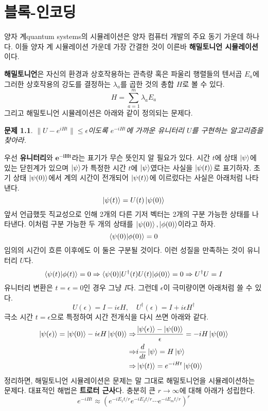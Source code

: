 \documentclass[a4paper,atbegshi,chapter,]{oblivoir}
\newtheorem{prob}{문제}[chapter]
\begin{document}
\chapter{블록-인코딩}
양자 계{\tiny quantum systems}의 시뮬레이션은 양자 컴퓨터 개발의 주요 동기 가운데 하나다.
이들 양자 계 시뮬레이션 가운데 가장 간결한 것이 이른바 \textbf{해밀토니언 시뮬레이션}이다.

\textbf{해밀토니언}은 자신의 환경과 상호작용하는 관측량 혹은 파울리 행렬들의 텐서곱
$E_a$에 그러한 상호작용의 강도를 결정하는 $\lambda_a$를 곱한 것의 총합 $H$로 볼 수 있다.
\[
  H = \sum_{a=1}^m\lambda_a E_a
\]
그리고 해밀토니언 시뮬레이션은 아래와 같이 정의되는 문제다.
\begin{prob}
  $\|U-e^{iHt}\|\leq\epsilon$이도록 $e^{-iHt}$에 가까운 유니터리 $U$를 구현하는
  알고리즘을 찾아라.
\end{prob}
우선 \textbf{유니터리}와 $\pmb{e^{-iHt}}$라는 표기가 무슨 뜻인지 알 필요가 있다.
시간 $t$에 상태 $\ket{\psi}$에 있는 닫힌계가 있으며 $\ket{\psi}$가 특정한 시간 $t$에
$\ket{\psi}$였다는 사실을 $\ket{\psi(t)}$로 표기하자. 초기 상태 $\ket{\psi(0)}$에서
계의 시간이 전개되어 $\ket{\psi(t)}$에 이르렀다는 사실은 아래처럼 나타낸다.
\[
  \ket{\psi(t)}=U(t)\ket{\psi(0)}
\]
앞서 언급했듯 직교성으로 인해 2개의 다른 기저 벡터는 2개의 구분 가능한 상태를 나타낸다.
이처럼 구분 가능한 두 개의 상태를 $\ket{\psi(0)},\ket{\phi(0)}$이라고 하자. 
\[
  \braket{\psi(0)|\phi(0)}=0
\]
임의의 시간이 흐른 이후에도 이 둘은 구분될 것이다. 이런 성질을 만족하는 것이 
유니터리 $U$다. 
\[
  \braket{\psi(t)|\phi(t)}=0 \Rightarrow \braket{\psi(0)|U^{\dagger}(t)U(t)|\phi(0)}=0
                             \Rightarrow U^{\dagger}U=I
\]
유니터리 변환은 $t=\epsilon=0$인 경우 그냥 $I$다. 그런데 $\epsilon$이 극미량이면
아래처럼 쓸 수 있다.
\[
  U(\epsilon)=I-i\epsilon H,\quad U^{\dagger}(\epsilon)=I+i\epsilon H^{\dagger}
\]
극소 시간 $t=\epsilon$으로 특정하여 시간 전개식을 다시 쓰면 아래와 같다.
\begin{align*}
  \ket{\psi(\epsilon)}=\ket{\psi(0)}-i\epsilon H\ket{\psi(0)}
  \Rightarrow &\frac{\ket{\psi(\epsilon)}-\ket{\psi(0)}}{\epsilon}=-iH\ket{\psi(0)} \\
  \Rightarrow & i\frac{d}{dt}\ket{\psi} = H\ket{\psi}\\
  \Rightarrow &\ket{\psi(t)}=e^{-iHt}\ket{\psi(0)}
\end{align*}
정리하면, 해밀토니언 시뮬레이션은 문제는 말 그대로 해밀토니언을 시뮬레이션하는
문제다. 대표적인 해법은 \textbf{트로터 근사}다. 충분히 큰 $r\rightarrow\infty$에
대해 아래가 성립한다.
\[
  e^{-iHt} \approx \left(e^{-iE_1t/r}e^{-iE_2t/r}\cdots e^{-iE_mt/r}\right)^r
\]
\end{document}
